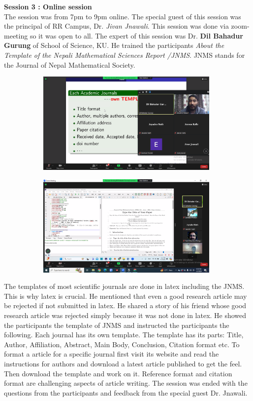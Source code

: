 \documentclass[a4paper,12pt]{report}
\begin{document}
{\bfseries \large Session 3 : Online session}\\[3mm]
The session was from 7pm to 9pm online. The special guest of this session was the principal of RR Campus, Dr. \textit{Jivan Jnawali}.  This session was done via zoom-meeting so it was open to all. The expert of this session was Dr. \textbf{Dil Bahadur Gurung} of School of Science, KU. He trained the participants \textit{About the Template of the Nepali Mathematical Sciences Report /JNMS}. JNMS stands for the Journal of Nepal Mathematical Society.

\begin{figure}[h!]
\centering
\begin{subfigure}{0.45\textwidth}
    \includegraphics[height=5cm, width=\textwidth]{online1.png}
\end{subfigure}
\hfill
\begin{subfigure}{0.45\textwidth}
    \includegraphics[height=5cm, width=\textwidth]{online2.png}
\end{subfigure}
\end{figure}

The templates of most scientific journals are done in latex including the JNMS. This is why latex is crucial. He mentioned that even a good research article may be rejected if not submitted in latex. He shared a story of his friend whose good research article was rejected simply because it was not done in latex. He showed the participants the template of JNMS and instructed the participants the following.
Each journal has its own template. The template has its parts: Title, Author, Affiliation, Abstract, Main Body, Conclusion, Citation format etc. To format a article for a specific journal first visit its website and read the instructions for authors and download a latest article published to get the feel. Then download the template and work on it. Reference format and citation format are challenging aspects of article writing.
The session was ended with the questions from the participants and feedback from the special guest Dr. Jnawali.
\end{document}
